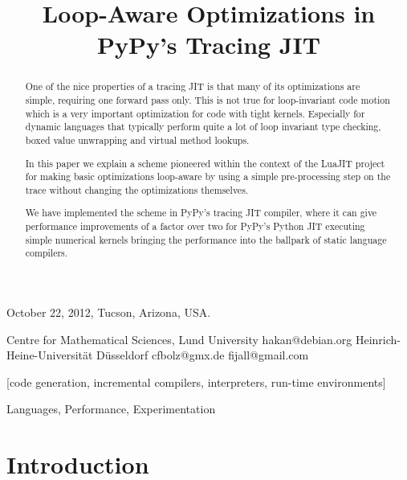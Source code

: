 \documentclass[preprint]{sigplanconf}
\begin{document}
 {October 22, 2012, Tucson, Arizona, USA.}


\title{Loop-Aware Optimizations in PyPy's Tracing JIT}

           {Centre for Mathematical Sciences, Lund University}
           {hakan@debian.org}
           {Heinrich-Heine-Universität Düsseldorf}
           {cfbolz@gmx.de}
           {}
           {fijall@gmail.com}

\maketitle

\begin{abstract}
One of the nice properties of a tracing JIT is that many of its optimizations
are simple, requiring one forward pass only. This is not true for loop-invariant code
motion which is a very important optimization for code with tight kernels.
Especially for dynamic languages that typically perform quite a lot of loop invariant
type checking, boxed value unwrapping and virtual method lookups.

In this paper we explain a scheme pioneered within the context of the LuaJIT project
for making basic optimizations loop-aware by
using a simple pre-processing step on the trace without changing the
optimizations themselves.

We have implemented the scheme in PyPy's tracing JIT compiler,
where it can give performance improvements of a
factor over two for PyPy's Python JIT executing simple numerical kernels
bringing the performance into the ballpark of static language compilers.
\end{abstract}

[code generation,
incremental compilers, interpreters, run-time environments]

\terms
Languages, Performance, Experimentation


\section{Introduction}
\end{document}
